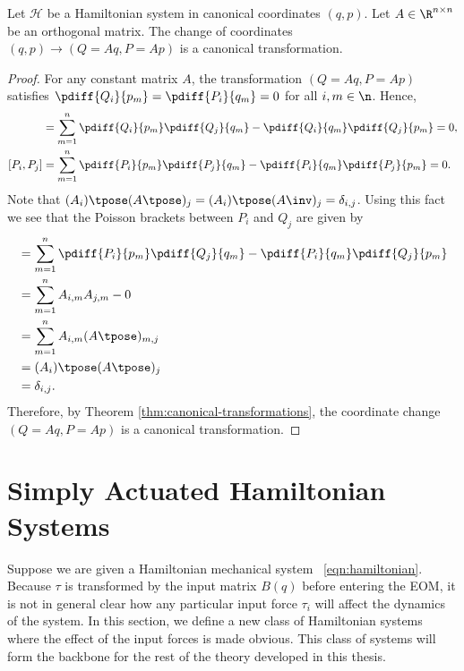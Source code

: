 \begin{lemma}\label{lemma:linear-is-canonical}
    Let \(\mathcal{H}\) be a Hamiltonian system in canonical coordinates
    \((q,p)\).
    Let \(A \in \R^{n\times n}\) be an orthogonal matrix.
    The change of coordinates \((q,p) \to (Q = Aq, P = Ap)\) is a canonical
    transformation.
\end{lemma}
\begin{proof}
    For any constant matrix \(A\), the transformation
    \((Q = Aq, P = Ap)\) satisfies
    \(\pdiff{Q_i}{p_m} = \pdiff{P_i}{q_m} = 0\) for all 
    \(i,m \in \n\).
    Hence, 
    \begin{align*}
        [Q_i,Q_j] &= \sum\limits_{m = 1}^n \pdiff{Q_i}{p_m}\pdiff{Q_j}{q_m} - 
        \pdiff{Q_i}{q_m}\pdiff{Q_j}{p_m} = 0
        , \\
        [P_i,P_j] &= \sum\limits_{m=1}^n \pdiff{P_i}{p_m}\pdiff{P_j}{q_m} -
        \pdiff{P_i}{q_m}\pdiff{P_j}{p_m} = 0
        .
    \end{align*}
    Note that \((A_i)\tpose (A\tpose)_j = (A_i)\tpose (A\inv)_j = \delta_{i,j}\). 
    Using this fact we see that the Poisson brackets between \(P_i\) and \(Q_j\)
    are given by
    \begin{align*}
        [P_i,Q_j] &= \sum\limits_{m=1}^n\pdiff{P_i}{p_m}\pdiff{Q_j}{q_m}
        - \pdiff{P_i}{q_m}\pdiff{Q_j}{p_m} \\
                  &= \sum\limits_{m=1}^n A_{i,m}A_{j,m} - 0 \\
                  &= \sum\limits_{m=1}^n A_{i,m}(A\tpose)_{m,j} \\
                  &= (A_i)\tpose (A\tpose)_j \\
                  &= \delta_{i,j}
        .
    \end{align*}
    Therefore, by Theorem \ref{thm:canonical-transformations}, the coordinate
    change \((Q = Aq, P = Ap)\) is a canonical transformation.
\end{proof}

\section{Simply Actuated Hamiltonian Systems}\label{sec:simply-actuated}
Suppose we are given a Hamiltonian mechanical system ~\eqref{eqn:hamiltonian}.
Because \(\tau\) is transformed by the input matrix \(B(q)\) before
entering the EOM, it is not in general clear how any particular input force \(\tau_i\)
will affect the dynamics of the system. 
In this section, we define a new class of Hamiltonian systems where the effect
of the input forces is made obvious. This class of
systems will form the backbone for the rest of the theory developed in this
thesis.


